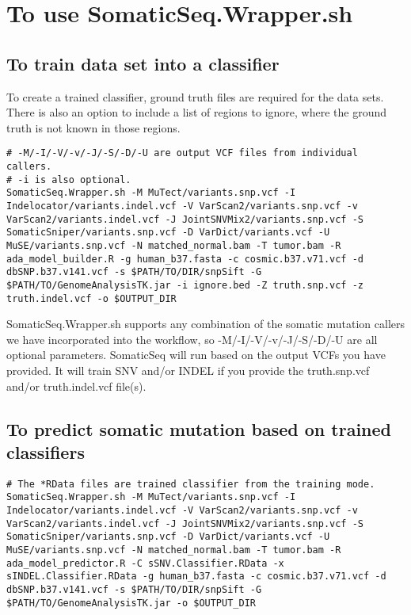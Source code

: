 \documentclass[10pt,letterpaper]{article}
\begin{document}
\begin{sloppypar}
\begin{itemize}
\end{itemize}



\section{To use SomaticSeq.Wrapper.sh}

\subsection{To train data set into a classifier}

To create a trained classifier, ground truth files are required for the data sets. There is also an option to include a list of regions to ignore, where the ground truth is not known in those regions. 

\begin{lstlisting}
# -M/-I/-V/-v/-J/-S/-D/-U are output VCF files from individual callers.
# -i is also optional.
SomaticSeq.Wrapper.sh -M MuTect/variants.snp.vcf -I Indelocator/variants.indel.vcf -V VarScan2/variants.snp.vcf -v VarScan2/variants.indel.vcf -J JointSNVMix2/variants.snp.vcf -S SomaticSniper/variants.snp.vcf -D VarDict/variants.vcf -U MuSE/variants.snp.vcf -N matched_normal.bam -T tumor.bam -R ada_model_builder.R -g human_b37.fasta -c cosmic.b37.v71.vcf -d dbSNP.b37.v141.vcf -s $PATH/TO/DIR/snpSift -G $PATH/TO/GenomeAnalysisTK.jar -i ignore.bed -Z truth.snp.vcf -z truth.indel.vcf -o $OUTPUT_DIR
\end{lstlisting}

SomaticSeq.Wrapper.sh supports any combination of the somatic mutation callers we have incorporated into the workflow, so -M/-I/-V/-v/-J/-S/-D/-U are all optional parameters. SomaticSeq will run based on the output VCFs you have provided. It will train SNV and/or INDEL if you provide the truth.snp.vcf and/or truth.indel.vcf file(s).




\subsection{To predict somatic mutation based on trained classifiers}

\begin{lstlisting}
# The *RData files are trained classifier from the training mode.
SomaticSeq.Wrapper.sh -M MuTect/variants.snp.vcf -I Indelocator/variants.indel.vcf -V VarScan2/variants.snp.vcf -v VarScan2/variants.indel.vcf -J JointSNVMix2/variants.snp.vcf -S SomaticSniper/variants.snp.vcf -D VarDict/variants.vcf -U MuSE/variants.snp.vcf -N matched_normal.bam -T tumor.bam -R ada_model_predictor.R -C sSNV.Classifier.RData -x sINDEL.Classifier.RData -g human_b37.fasta -c cosmic.b37.v71.vcf -d dbSNP.b37.v141.vcf -s $PATH/TO/DIR/snpSift -G $PATH/TO/GenomeAnalysisTK.jar -o $OUTPUT_DIR
\end{lstlisting}




\end{sloppypar}
\end{document}
